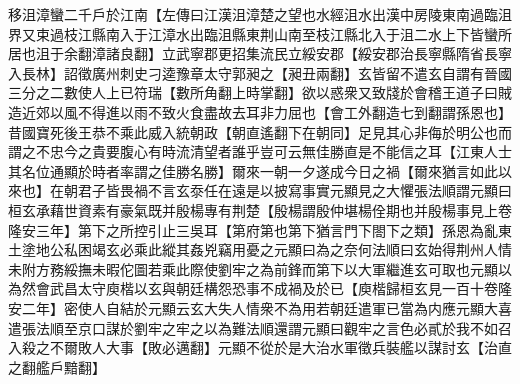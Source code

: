 移沮漳蠻二千戶於江南【左傳曰江漢沮漳楚之望也水經沮水出漢中房陵東南過臨沮界又束過枝江縣南入于江漳水出臨沮縣東荆山南至枝江縣北入于沮二水上下皆蠻所居也沮于余翻漳諸良翻】立武寧郡更招集流民立綏安郡【綏安郡治長寧縣隋省長寧入長林】詔徵廣州刺史刁逵豫章太守郭昶之【昶丑兩翻】玄皆留不遣玄自謂有晉國三分之二數使人上已符瑞【數所角翻上時掌翻】欲以惑衆又致牋於會稽王道子曰賊造近郊以風不得進以雨不致火食盡故去耳非力屈也【會工外翻造七到翻謂孫恩也】昔國寶死後王恭不乘此威入統朝政【朝直遙翻下在朝同】足見其心非侮於明公也而謂之不忠今之貴要腹心有時流清望者誰乎豈可云無佳勝直是不能信之耳【江東人士其名位通顯於時者率謂之佳勝名勝】爾來一朝一夕遂成今日之禍【爾來猶言如此以來也】在朝君子皆畏禍不言玄沗任在遠是以披寫事實元顯見之大懼張法順謂元顯曰桓玄承藉世資素有豪氣既并殷楊專有荆楚【殷楊謂殷仲堪楊佺期也并殷楊事見上卷隆安三年】第下之所控引止三吳耳【第府第也第下猶言門下閤下之類】孫恩為亂東土塗地公私困竭玄必乘此縱其姦兇竊用憂之元顯曰為之奈何法順曰玄始得荆州人情未附方務綏撫未暇佗圖若乘此際使劉牢之為前鋒而第下以大軍繼進玄可取也元顯以為然會武昌太守庾楷以玄與朝廷構怨恐事不成禍及於已【庾楷歸桓玄見一百十卷隆安二年】密使人自結於元顯云玄大失人情衆不為用若朝廷遣軍已當為内應元顯大喜遣張法順至京口謀於劉牢之牢之以為難法順還謂元顯曰觀牢之言色必貳於我不如召入殺之不爾敗人大事【敗必邁翻】元顯不從於是大治水軍徵兵裝艦以謀討玄【治直之翻艦戶黯翻】


